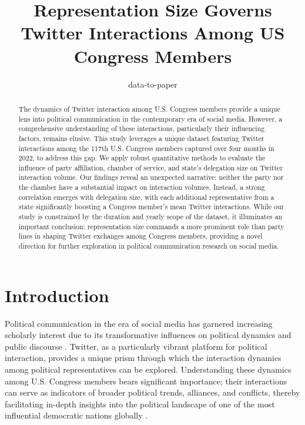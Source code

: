 \documentclass[11pt]{article}
\title{Representation Size Governs Twitter Interactions Among US Congress Members}
\author{data-to-paper}
\begin{document}
\maketitle
\begin{abstract}
The dynamics of Twitter interaction among U.S. Congress members provide a unique lens into political communication in the contemporary era of social media. However, a comprehensive understanding of these interactions, particularly their influencing factors, remains elusive. This study leverages a unique dataset featuring Twitter interactions among the 117th U.S. Congress members captured over four months in 2022, to address this gap. We apply robust quantitative methods to evaluate the influence of party affiliation, chamber of service, and state's delegation size on Twitter interaction volume. Our findings reveal an unexpected narrative: neither the party nor the chamber have a substantial impact on interaction volumes. Instead, a strong correlation emerges with delegation size, with each additional representative from a state significantly boosting a Congress member's mean Twitter interactions. While our study is constrained by the duration and yearly scope of the dataset, it illuminates an important conclusion: representation size commands a more prominent role than party lines in shaping Twitter exchanges among Congress members, providing a novel direction for further exploration in political communication research on social media.
\end{abstract}
\section*{Introduction}

Political communication in the era of social media has garnered increasing scholarly interest due to its transformative influences on political dynamics and public discourse \cite{Ausserhofer2013NATIONALPO, Stier2018ElectionCO, Jungherr2016TwitterUI}. Twitter, as a particularly vibrant platform for political interaction, provides a unique prism through which the interaction dynamics among political representatives can be explored. Understanding these dynamics among U.S. Congress members bears significant importance; their interactions can serve as indicators of broader political trends, alliances, and conflicts, thereby facilitating in-depth insights into the political landscape of one of the most influential democratic nations globally \cite{Bail2019AssessingTR, Mendelsohn2021ModelingFI, Enli2013PERSONALIZEDCI}.
\end{document}
